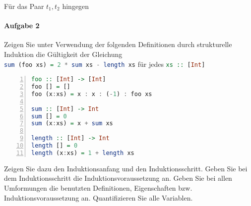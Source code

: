 \documentclass{scrreprt}
\begin{document}
\begin{enumerate}[(a)]
  Für das Paar $t_1, t_2$ hingegen
\end{enumerate}

\newpage
\paragraph{Aufgabe 2} Zeigen Sie unter Verwendung der folgenden Definitionen
durch strukturelle Induktion die Gültigkeit der Gleichung \\
\noindent
\lstinline[language=Haskell]{sum (foo xs) = 2 * sum xs - length xs} für jedes
\lstinline[language=Haskell]{xs :: [Int]}

\begin{lstlisting}[language=Haskell, numbers=left]
foo :: [Int] -> [Int]
foo [] = []
foo (x:xs) = x : x : (-1) : foo xs

sum :: [Int] -> Int
sum [] = 0
sum (x:xs) = x + sum xs

length :: [Int] -> Int
length [] = 0
length (x:xs) = 1 + length xs
\end{lstlisting}

Zeigen Sie dazu den Induktionsanfang und den Induktionsschritt.
Geben Sie bei dem Induktionsschritt die Induktionsvoraussetzung an.
Geben Sie bei allen Umformungen die benutzten Definitionen, Eigenschaften
bzw. Induktionsvoraussetzung an.
Quantifizieren Sie alle Variablen.
\end{document}
